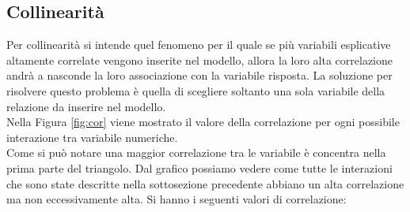 \subsection{Collinearità}
Per collinearità si intende quel fenomeno per il quale se più variabili esplicative altamente correlate vengono inserite nel modello, allora la loro alta correlazione andrà a nasconde la loro associazione con la variabile risposta. La soluzione per risolvere questo problema è quella di scegliere soltanto una sola variabile della relazione da inserire nel modello.\\
Nella Figura \ref{fig:cor} viene mostrato il valore della correlazione per ogni possibile interazione tra variabile numeriche.\\
Come si può notare una maggior correlazione tra le variabile è concentra nella prima parte del triangolo. Dal grafico possiamo vedere come tutte le interazioni che sono state descritte nella sottosezione precedente abbiano un alta correlazione ma non eccessivamente alta. Si hanno i seguenti valori di correlazione:
